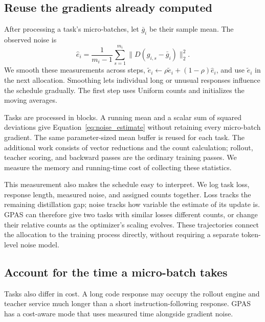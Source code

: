 \subsection{Reuse the gradients already computed}
\label{sec:online_estimates}

After processing a task's micro-batches, let $\bar g_i$ be their sample mean.
The observed noise is
\begin{equation}
    \widehat e_i=\frac1{m_i-1}\sum_{s=1}^{m_i}
                    \|D(g_{i,s}-\bar g_i)\|_2^2.
    \label{eq:noise_estimate}
\end{equation}
We smooth these measurements across steps,
$\widetilde e_i\leftarrow\rho\widetilde e_i+(1-\rho)\widehat e_i$,
and use $\widetilde e_i$ in the next allocation. Smoothing lets individual
long or unusual responses influence the schedule gradually. The first step
uses Uniform counts and initializes the moving averages.

Tasks are processed in blocks. A running mean and a scalar sum of squared
deviations give Equation~\ref{eq:noise_estimate} without retaining every
micro-batch gradient. The same parameter-sized mean buffer is reused for
each task. The additional work consists of vector reductions and the count
calculation; rollout, teacher scoring, and backward passes are the ordinary
training passes. We measure the memory and running-time cost of collecting
these statistics.

This measurement also makes the schedule easy to interpret. We log task
loss, response length, measured noise, and assigned counts together.
Loss tracks the remaining distillation gap; noise tracks how variable
the estimate of its update is. GPAS can therefore give two tasks with
similar losses different counts, or change their relative counts as
the optimizer's scaling evolves. These trajectories connect the allocation
to the training process directly, without requiring a separate token-level
noise model.

\subsection{Account for the time a micro-batch takes}

Tasks also differ in cost. A long code response may occupy the rollout
engine and teacher service much longer than a short instruction-following
response. GPAS has a cost-aware mode that uses measured time alongside
gradient noise.

